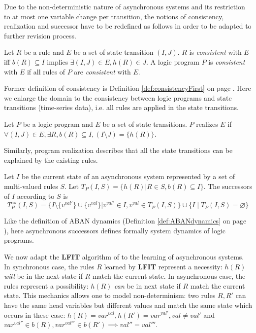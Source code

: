 Due to the non-deterministic nature of asynchronous systems and its restriction to at most one variable change per transition,
the notions of consistency, realization and successor have to be redefined as follows in order to be adapted to further revision process.

\begin{definition}[Consistency]\label{def:consistencySecond}
	Let $R$ be a rule and $E$ be a set of state transition $(I,J)$.
	$R$ is {\it consistent} with $E$ iff
	$b(R)\subseteq I$ implies $\exists (I,J) \in E, h(R) \in J$.
	A logic program $P$ is {\it consistent} with $E$ if all rules of $P$ are {\it consistent} with $E$.
\end{definition}

Former definition of consistency is Definition \ref{def:consistencyFirst} on page \pageref{def:consistencyFirst}.
Here we enlarge the domain to the consistency between logic programs and state transitions (time-series data), i.e. all rules are applied in the state transitions. 

\begin{definition}
	Let $P$ be a logic program and $E$ be a set of state transitions.
	$P$ realizes $E$ if $\forall (I,J) \in E, \exists R, b(R) \subseteq I, (I \setminus J) = \{h(R)\}$.
\end{definition}

Similarly, program realization describes that all the state transitions can be explained by the existing rules.

\begin{definition}
	Let $I$ be the current state of an asynchronous system represented by a set of multi-valued rules $S$.
	Let $T_P(I,S) = \{h(R) | R \in S, b(R) \subseteq I\}$.
	The successors of $I$ according to $S$ is
	$$T_P^{as}(I,S) = \{I \setminus \{v^{val'}\} \cup \{v^{val}\} | v^{val'} \in I, v^{val} \in T_P(I,S)\} \cup \{I \mid T_P(I,S) = \varnothing\}$$ %
\end{definition}

Like the definition of ABAN dynamics (Definition \ref{def:ABANdynamics} on page \pageref{def:ABANdynamics}), here asynchronous successors defines formally system dynamics of logic programs.

We now adapt the {\bf LFIT} algorithm of \cite{ribeiro2015learning} to the learning of asynchronous systems.
In synchronous case, the rules $R$ learned by {\bf LFIT} represent a necessity: $h(R)$ \textit{will} be in the next state if $R$ match the current state.
In asynchronous case, the rules represent a possibility: $h(R)$ \textit{can} be in next state if $R$ match the current state.
This mechanics allows one to model non-determinism: two rules $R, R'$ can have the same head variables but different values and match the same state which occurs in these case:
$h(R)=var^{val}, h(R')=var^{val'}, val \neq val'$ and $var^{val''} \in b(R), var^{val'''}\in b(R') \implies val'' = val'''$.

